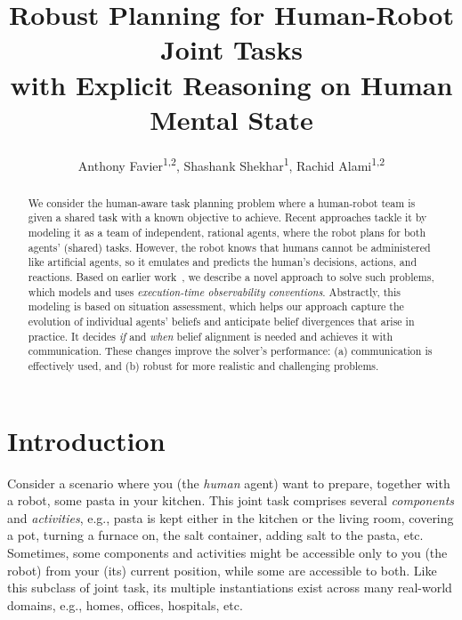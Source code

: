 \documentclass[letterpaper]{article} %
\title
{
Robust Planning for Human-Robot Joint Tasks \\ with Explicit Reasoning on Human Mental State
}
\author{
    Anthony Favier\textsuperscript{\rm 1,2},
    Shashank Shekhar\textsuperscript{\rm 1},
    Rachid Alami\textsuperscript{\rm 1,2}
}
\begin{document}


\maketitle

\begin{abstract}
We consider the human-aware task planning problem where a human-robot team is given a shared task with a known objective to achieve. Recent approaches tackle it by modeling it as a team of independent, rational agents, where the robot plans for both agents' (shared) tasks. However, the robot knows that humans cannot be administered like artificial agents, so it emulates and predicts the human's decisions, actions, and reactions. 
Based on earlier work~\cite{buisan:hal-03684211}, we describe a novel approach to solve such problems, which models and uses {\em execution-time observability conventions}. 
Abstractly, this modeling is based on situation assessment, which helps our approach capture the evolution of individual agents' beliefs and anticipate belief divergences that arise in practice.
It decides {\em if} and {\em when} belief alignment is needed and achieves it with communication.
These changes improve the solver's performance: (a) communication is effectively used, and (b) robust for more realistic and challenging problems.
\end{abstract}

\section{Introduction}

Consider a scenario where you (the \textit{human} agent) want to prepare, together with a robot, some pasta in your kitchen. This joint task comprises several \textit{components} and \textit{activities}, e.g., pasta is kept either in the kitchen or the living room, covering a pot, turning a furnace on, 
the salt container, adding salt to the pasta, etc. 
Sometimes, some components and activities might be accessible only to you (the robot) from your (its) current position, while some are accessible to both. 
Like this subclass of joint task, its multiple instantiations exist across many real-world domains, e.g., homes, offices, hospitals, etc.
\end{document}
